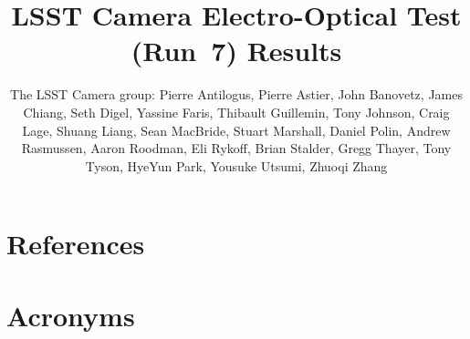 \documentclass[SE,lsstdraft,authoryear,toc]{lsstdoc}
\title{LSST Camera Electro-Optical Test (Run~7) Results}
\author{%
The LSST Camera group:
Pierre Antilogus,
Pierre Astier,
John Banovetz,
James Chiang,
Seth Digel,
Yassine Faris,
Thibault Guillemin,
Tony Johnson,
Craig Lage,
Shuang Liang,
Sean MacBride,
Stuart Marshall,
Daniel Polin,
Andrew Rasmussen,
Aaron Roodman,
Eli Rykoff,
Brian Stalder,
Gregg Thayer,
Tony Tyson,
HyeYun Park,
Yousuke Utsumi,
Zhuoqi Zhang
}
\date{\vcsDate}
\begin{document}
\maketitle















\appendix

\clearpage

\section{References} \label{sec:bib}
\renewcommand{\refname}{} %

\clearpage


\section{Acronyms} \label{sec:acronyms}

\end{document}

